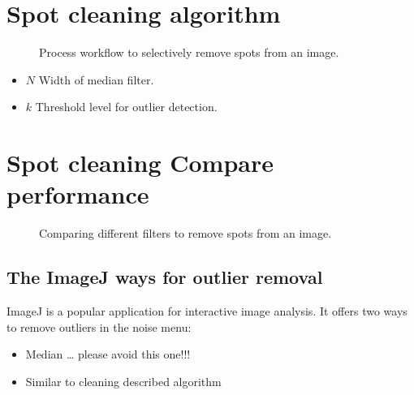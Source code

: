 \documentclass[letterpaper,10pt,english]{sphinxmanual}
\begin{document}
\section{Spot cleaning algorithm}
\label{\detokenize{02-ImageEnhancement:spot-cleaning-algorithm}}
\begin{figure}[htbp]
\centering
\capstart

\noindent{}
\caption{Process workflow to selectively remove spots from an image.}\label{\detokenize{02-ImageEnhancement:id12}}\end{figure}



\sphinxAtStartPar
{}
\begin{itemize}
\item {} 
\sphinxAtStartPar
\(N\) Width of median filter.

\item {} 
\sphinxAtStartPar
\(k\) Threshold level for outlier detection.

\end{itemize}


\section{Spot cleaning \sphinxhyphen{} Compare performance}
\label{\detokenize{02-ImageEnhancement:spot-cleaning-compare-performance}}
\begin{figure}[htbp]
\centering
\capstart

\noindent{}
\caption{Comparing different filters to remove spots from an image.}\label{\detokenize{02-ImageEnhancement:id13}}\end{figure}




\subsection{The ImageJ ways for outlier removal}
\label{\detokenize{02-ImageEnhancement:the-imagej-ways-for-outlier-removal}}
\sphinxAtStartPar
ImageJ is a popular application for interactive image analysis. It offers two ways to remove outliers in the noise menu:
\begin{itemize}
\item {} 
\sphinxAtStartPar
{} Median … please avoid this one!!!

\item {} 
\sphinxAtStartPar
{} Similar to cleaning described algorithm

\end{itemize}
\end{document}
